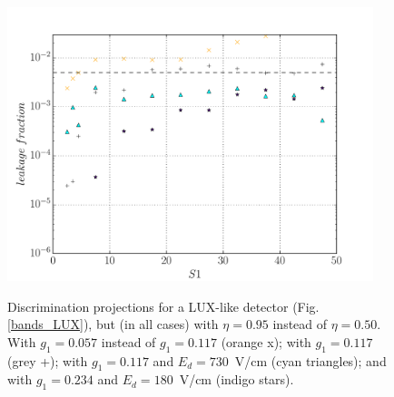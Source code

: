 \documentclass[article]{revtex4-1}[11pt]
\begin{document}
\begin{figure}[h]
\begin{center}
\vskip -0.0cm
\includegraphics[width=0.95\textwidth]{figs/disc5.pdf}
\vskip -0.1cm
\caption{Discrimination projections for a LUX-like detector (Fig. \ref{bands_LUX}), but (in all cases) with $\eta=0.95$ instead of $\eta=0.50$. With $g_1=0.057$ instead of $g_1=0.117$ (orange x); with $g_1=0.117$ (grey +); with  $g_1=0.117$ and $E_d=730$~V/cm (cyan triangles); and with $g_1=0.234$ and $E_d=180$~V/cm (indigo stars).  }
\vskip -0.5cm
\label{bands_XENON10}
\end{center}
\end{figure} 




%


\end{document}

